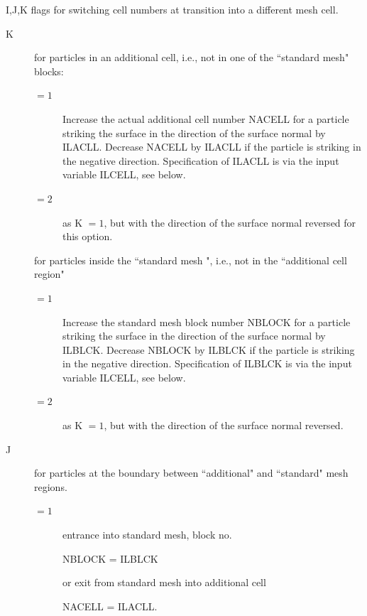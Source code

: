 \begin{description}
        I,J,K flags for switching cell numbers at transition into a different mesh
        cell.
        \begin{description}
          \item[K] for particles in an additional cell, i.e., not in one of the
                ``standard mesh" blocks:
                \begin{description}
                  \item[$= 1$] Increase the actual additional cell number NACELL for a particle
                        striking the surface in the direction of the surface normal by ILACLL.
                        Decrease NACELL by ILACLL if the particle is striking in the negative
                        direction.
                        Specification of ILACLL is via the input variable ILCELL, see below.
                  \item[$= 2$] as K $= 1$, but with the direction of the surface normal reversed
                        for this option.
                \end{description}
                for particles inside the ``standard mesh ", i.e., not in the
                ``additional
                cell region"
                \begin{description}
                  \item[$= 1$] Increase the standard mesh block number NBLOCK for a particle
                        striking the surface in the direction of the surface normal by ILBLCK.
                        Decrease NBLOCK by ILBLCK if the particle is striking in the negative
                        direction.
                        Specification of ILBLCK is via the input variable ILCELL, see below.
                  \item[$= 2$] as K $= 1$, but with the direction of the surface normal reversed.
                \end{description}
          \item[J] for particles at the boundary between ``additional" and ``standard"
                mesh regions.
                \begin{description}
                  \item[$= 1$] entrance into standard mesh, block no.

                        NBLOCK = ILBLCK 

                        or exit from standard mesh into additional cell 

                        NACELL = ILACLL.


\end{description}
\end{description}
\end{description}
